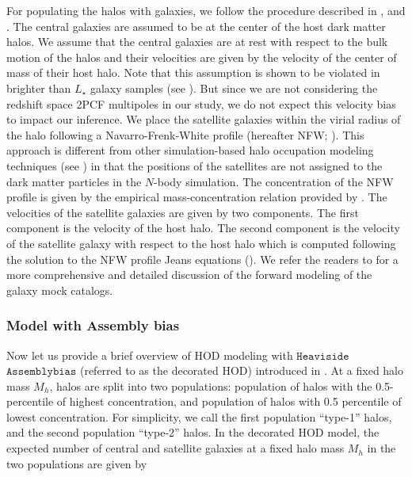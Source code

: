 \documentclass[12pt, preprint]{aastex}
\begin{document}
For populating the halos with galaxies, we follow the procedure described in \citet{2016arXiv160701782H}, and \citet{decorated}. The central galaxies are assumed to be at the center of the host dark matter halos. We assume that the central galaxies are at rest with respect to the bulk motion of the halos and their velocities are given by the velocity of the center of mass of their host halo. Note that this assumption is shown to be violated in brighter than $L_{\star}$ galaxy samples (see \citealt{guo2015}). But since we are not considering the redshift space 2PCF multipoles in our study, we do not expect this velocity bias to impact our inference. We place the satellite galaxies within the virial radius of the halo following a Navarro-Frenk-White profile (hereafter NFW; \citealt{nfw}). This approach is different from other simulation-based halo occupation modeling techniques (see \citealt{hod_vs_sham,zheng_guo}) in that the positions of the satellites are not assigned to the dark matter particles in the $N$-body simulation. 
The concentration of the NFW profile is given by the empirical mass-concentration relation provided by \citet{nfw_c(M)}. The velocities of the satellite galaxies are given by two components. The first component is the velocity of the host halo. The second component is the velocity of the satellite galaxy with respect to the host halo which is computed following the solution to the NFW profile Jeans equations (\citealt{more2010}). We refer the readers to \citet{decorated} for a more comprehensive and detailed discussion of the forward modeling of the galaxy mock catalogs.

\subsubsection{Model with Assembly bias}\label{subsubsec:decorated}
Now let us provide a brief overview of HOD modeling with $\mathtt{Heaviside}$ $\mathtt{Assemblybias}$ (referred to as the decorated HOD) introduced in \citet{decorated}. At a fixed halo mass $M_{h}$, halos are split into two populations: population of halos with the 0.5-percentile of highest concentration, and population of halos with 0.5 percentile of lowest concentration. For simplicity, we call the first population ``type-1'' halos, and the second population ``type-2'' halos. In the decorated HOD model, the expected number of central and satellite galaxies at a fixed halo mass $M_{h}$ in the two populations are given by
\end{document}
